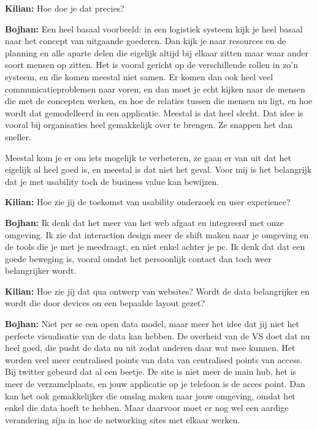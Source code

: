 \textbf{Kilian:} Hoe doe je dat precies?

\textbf{Bojhan:} Een heel basaal voorbeeld: in een logistiek systeem kijk je heel basaal naar het concept van uitgaande goederen. Dan kijk je naar resources en de planning en alle aparte delen die eigelijk altijd bij elkaar zitten maar waar ander soort mensen op zitten. Het is vooral gericht op de verschillende rollen in zo'n systeem, en die komen meestal niet samen. Er komen dan ook heel veel communicatieproblemen naar voren, en dan moet je echt kijken naar de mensen die met de concepten werken, en hoe de relaties tussen die mensen nu ligt, en hoe wordt dat gemodelleerd in een applicatie. Meestal is dat heel slecht. Dat idee is vooral bij organisaties heel gemakkelijk over te brengen. Ze snappen het dan sneller.

Meestal kom je er om iets mogelijk te verbeteren, ze gaan er van uit dat het eigelijk al heel goed is, en meestal is dat niet het geval. Voor mij is het belangrijk dat je met usability toch de business value kan bewijzen.

\textbf{Kilian:} Hoe zie jij de toekomst van usability onderzoek en user experience?

\textbf{Bojhan:} Ik denk dat het meer van het web afgaat en integreerd met onze omgeving. Ik zie dat interaction design meer de shift maken naar je omgeving en de tools die je met je meedraagt, en niet enkel achter je pc. Ik denk dat dat een goede beweging is, vooral omdat het persoonlijk contact dan toch weer belangrijker wordt.

\textbf{Kilian:} Hoe zie jij dat qua ontwerp van websites? Wordt de data belangrijker en wordt die door devices on een bepaalde layout gezet?

\textbf{Bojhan:} Niet per se een open data model, maar meer het idee dat jij niet het perfecte visualisatie van de data kan hebben. De overheid van de VS doet dat nu heel goed, die pusht de data nu uit zodat anderen daar wat mee kunnen. Het worden veel meer centralised points van data van centralised points van access. Bij twitter gebeurd dat al een beetje. De site is niet meer de main hub, het is meer de verzamelplaats, en jouw applicatie op je telefoon is de acces point. Dan kan het ook gemakkelijker die omslag maken naar jouw omgeving, omdat het enkel die data hoeft te hebben. Maar daarvoor moet er nog wel een aardige verandering zijn in hoe de networking sites met elkaar werken.

